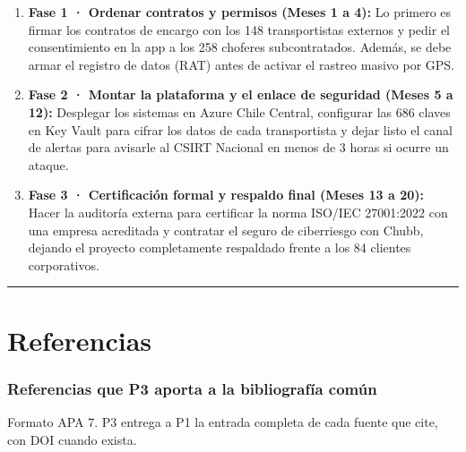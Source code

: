 \begin{enumerate}
\def\labelenumi{\arabic{enumi}.}
\tightlist
\item
  \textbf{Fase 1 · Ordenar contratos y permisos (Meses 1 a 4):} Lo primero es firmar los contratos de encargo con los 148 transportistas externos y pedir el consentimiento en la app a los 258 choferes subcontratados. Además, se debe armar el registro de datos (RAT) antes de activar el rastreo masivo por GPS.
\item
  \textbf{Fase 2 · Montar la plataforma y el enlace de seguridad (Meses 5 a 12):} Desplegar los sistemas en Azure Chile Central, configurar las 686 claves en Key Vault para cifrar los datos de cada transportista y dejar listo el canal de alertas para avisarle al CSIRT Nacional en menos de 3 horas si ocurre un ataque.
\item
  \textbf{Fase 3 · Certificación formal y respaldo final (Meses 13 a 20):} Hacer la auditoría externa para certificar la norma ISO/IEC 27001:2022 con una empresa acreditada y contratar el seguro de ciberriesgo con Chubb, dejando el proyecto completamente respaldado frente a los 84 clientes corporativos.
\end{enumerate}

\begin{center}\rule{0.5\linewidth}{0.5pt}\end{center}

\section{Referencias}\label{referencias}

\subsubsection{Referencias que P3 aporta a la bibliografía común}\label{referencias-que-p3-aporta-a-la-bibliografuxeda-comuxfan}

Formato APA 7. P3 entrega a P1 la entrada completa de cada fuente que cite, con DOI cuando exista.

